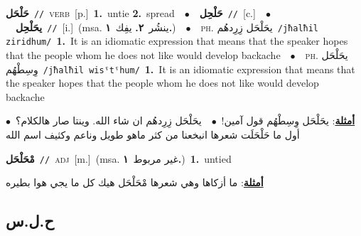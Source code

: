 \documentclass[10pt,a4paper,twoside]{article} %
\begin{document}
\begin{multicols}{2}
{\setlength\topsep{0pt}\textbf{\foreignlanguage{arabic}{حَلْحَل}}\ {\color{gray}\texttt{//}\color{black}}\ \textsc{verb}\ [p.]\ \textbf{1.}~untie  \textbf{2.}~spread\ \ $\bullet$\ \ \setlength\topsep{0pt}\textbf{\foreignlanguage{arabic}{حَلْحِل}}\ {\color{gray}\texttt{//}\color{black}}\ [c.]\ \ $\bullet$\ \ \setlength\topsep{0pt}\textbf{\foreignlanguage{arabic}{يحَلْحِل}}\ {\color{gray}\texttt{//}\color{black}}\ [i.]\ \color{gray}(msa. \foreignlanguage{arabic}{ينشُر}~\foreignlanguage{arabic}{\textbf{٢.}}  \foreignlanguage{arabic}{يفِك}~\foreignlanguage{arabic}{\textbf{١.}})\color{black}\ \ $\bullet$\ \ \textsc{ph.} \color{gray} \foreignlanguage{arabic}{يحَلْحَل زِرِدهُم}\color{black}\ {\color{gray}\texttt{/{\sffamily jħalħil ziridhum}/}\color{black}}\ \textbf{1.}~It is an idiomatic expression that means that the speaker hopes that the people whom he does not like would develop backache\ \ $\bullet$\ \ \textsc{ph.} \color{gray} \foreignlanguage{arabic}{يحَلْحَل وِسِطْهُم}\color{black}\ {\color{gray}\texttt{/{\sffamily jħalħil wisˤtˤhum}/}\color{black}}\ \textbf{1.}~It is an idiomatic expression that means that the speaker hopes that the people whom he does not like would develop backache\  \begin{flushright}\color{gray}\foreignlanguage{arabic}{\textbf{\underline{\foreignlanguage{arabic}{أمثلة}}}: يحَلْحَل وِسِطْهُم قول آمين!\ $\bullet$\ \  يحَلْحَل زِرِدهُم ان شاء الله. وينتا صار هالكلام؟\ $\bullet$\ \  أول ما حَلْحَلَت شعرها انبخعنا من كثر ماهو طويل وناعم وكثيف اسم الله}\end{flushright}\color{black}} \vspace{2mm}

{\setlength\topsep{0pt}\textbf{\foreignlanguage{arabic}{مْحَلْحَل}}\ {\color{gray}\texttt{//}\color{black}}\ \textsc{adj}\ [m.]\ \color{gray}(msa. \foreignlanguage{arabic}{غير مربوط}~\foreignlanguage{arabic}{\textbf{١.}})\color{black}\ \textbf{1.}~untied\  \begin{flushright}\color{gray}\foreignlanguage{arabic}{\textbf{\underline{\foreignlanguage{arabic}{أمثلة}}}: ما أزكاها وهي شعرها مْحَلْحَل هيك كل ما يجي هوا بطيره}\end{flushright}\color{black}} \vspace{2mm}

\vspace{-3mm}
\subsection*{\color{blue}\foreignlanguage{arabic}{ح.ل.س}\color{blue}{}} 


\end{multicols}
\end{document}
